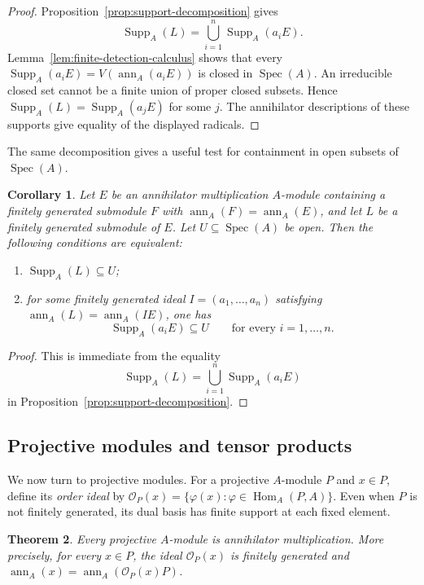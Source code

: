 \documentclass[11pt]{amsart}
\theoremstyle{plain}
\newtheorem{theorem}{Theorem}[section]
\newtheorem{corollary}[theorem]{Corollary}
\theoremstyle{definition}
\theoremstyle{remark}
\DeclareMathOperator{\Spec}{Spec}
\DeclareMathOperator{\Supp}{Supp}
\DeclareMathOperator{\Hom}{Hom}
\newcommand{\ann}{\operatorname{ann}}
\numberwithin{equation}{section}
\begin{document}
\begin{proof}
Proposition~\ref{prop:support-decomposition} gives
\[
\Supp_A(L)=\bigcup_{i=1}^n \Supp_A(a_iE).
\]
Lemma~\ref{lem:finite-detection-calculus} shows that every
$\Supp_A(a_iE)=V(\ann_A(a_iE))$ is closed in $\Spec(A)$. An irreducible closed set cannot be a finite union of proper closed
subsets. Hence $\Supp_A(L)=\Supp_A(a_jE)$ for some $j$. The annihilator descriptions of these supports give equality of the
displayed radicals.
\end{proof}

The same decomposition gives a useful test for containment in open subsets of
$\Spec(A)$.

\begin{corollary}
\label{cor:local-support-test}
Let $E$ be an annihilator multiplication $A$-module containing a
finitely generated submodule $F$ with $\ann_A(F)=\ann_A(E)$, and let
$L$ be a finitely generated submodule of $E$. Let $U\subseteq\Spec(A)$ be open.
Then the following conditions are equivalent:
\begin{enumerate}[label=\textup{(\roman*)}]
  \item $\Supp_A(L)\subseteq U$;
  \item for some finitely generated ideal $I=(a_1,\ldots,a_n)$ satisfying
  $\ann_A(L)=\ann_A(IE)$, one has
  \[
    \Supp_A(a_iE)\subseteq U\qquad\text{for every }i=1,\ldots,n.
  \]
\end{enumerate}
\end{corollary}

\begin{proof}
This is immediate from the equality
\[
\Supp_A(L)=\bigcup_{i=1}^n \Supp_A(a_iE)
\]
in Proposition~\ref{prop:support-decomposition}.
\end{proof}

\subsection{Projective modules and tensor products}

We now turn to projective modules. For a projective $A$-module $P$
and $x\in P$, define its \emph{order ideal} by
$\mathcal O_P(x)=\{\varphi(x):\varphi\in\Hom_A(P,A)\}$.
Even when $P$ is not finitely generated, its dual basis has finite
support at each fixed element.

\begin{theorem}\label{thm:fg-projective}
Every projective $A$-module is annihilator multiplication.
More precisely, for every $x\in P$, the ideal $\mathcal O_P(x)$ is
finitely generated and
$\ann_A(x)=\ann_A(\mathcal O_P(x)P)$.
\end{theorem}
\end{document}
